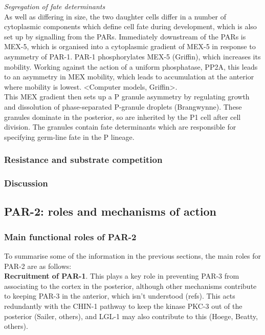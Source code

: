 \documentclass[12pt]{"article"}
\begin{document}
\textit{Segregation of fate determinants}\\

As well as differing in size, the two daughter cells differ in a number of cytoplasmic components which define cell fate during development, which is also set up by signalling from the PARs. Immediately downstream of the PARs is MEX-5, which is organised into a cytoplasmic gradient of MEX-5 in response to asymmetry of PAR-1. PAR-1 phosphorylates MEX-5 (Griffin), which increases its mobility. Working against the action of a uniform phosphatase, PP2A, this leads to an asymmetry in MEX mobility, which leads to accumulation at the anterior where mobility is lowest. <Computer models, Griffin>. \\

This MEX gradient then sets up a P granule asymmetry by regulating growth and dissolution of phase-separated P-granule droplets (Brangwynne). These granules dominate in the posterior, so are inherited by the P1 cell after cell division. The granules contain fate determinants which are responsible for specifying germ-line fate in the P lineage.\\


\subsubsection{Resistance and substrate competition}

\subsubsection{Discussion}

\clearpage
\subsection{PAR-2: roles and mechanisms of action}
\subsubsection{Main functional roles of PAR-2}

To summarise some of the information in the previous sections, the main roles for PAR-2 are as follows:\\

\textbf{Recruitment of PAR-1}. This plays a key role in preventing PAR-3 from associating to the cortex in the posterior, although other mechanisms contribute to keeping PAR-3 in the anterior, which isn’t understood (refs). This acts redundantly with the CHIN-1 pathway to keep the kinase PKC-3 out of the posterior (Sailer, others), and LGL-1 may also contribute to this (Hoege, Beatty, others). \\
\end{document}
